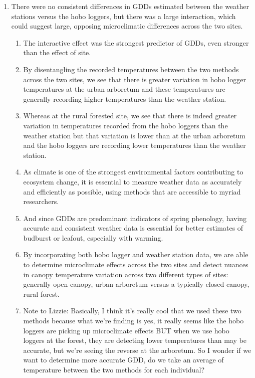 \documentclass{article}\usepackage[]{graphicx}\usepackage[]{color}
\begin{document}
\begin{enumerate}
\begin{enumerate}
\item There were no consistent differences in GDDs estimated between the weather stations versus the hobo loggers, but there was a large interaction, which could suggest large, opposing microclimatic differences across the two sites.
  \begin{enumerate} 
  \item The interactive effect was the strongest predictor of GDDs, even stronger than the effect of site.
  \item By disentangling the recorded temperatures between the two methods across the two sites, we see that there is greater variation in hobo logger temperatures at the urban arboretum and these temperatures are generally recording higher temperatures than the weather station.
  \item Whereas at the rural forested site, we see that there is indeed greater variation in temperatures recorded from the hobo loggers than the weather station but that variation is lower than at the urban arboretum and the hobo loggers are recording lower temperatures than the weather station.
  \item As climate is one of the strongest environmental factors contributing to ecosystem change, it is essential to measure weather data as accurately and efficiently as possible, using methods that are accessible to myriad researchers.
  \item And since GDDs are predominant indicators of spring phenology, having accurate and consistent weather data is essential for better estimates of budburst or leafout, especially with warming.
  \item By incorporating both hobo logger and weather station data, we are able to determine microclimate effects across the two sites and detect nuances in canopy temperature variation across two different types of sites: generally open-canopy, urban arboretum versus a typically closed-canopy, rural forest. 
  \item Note to Lizzie: Basically, I think it's really cool that we used these two methods because what we're finding is yes, it really seems like the hobo loggers are picking up microclimate effects BUT when we use hobo loggers at the forest, they are detecting lower temperatures than may be accurate, but we're seeing the reverse at the arboretum. So I wonder if we want to determine more accurate GDD, do we take an average of temperature between the two methods for each individual?
  \end{enumerate}
\end{enumerate}


\end{enumerate}
\end{document}
